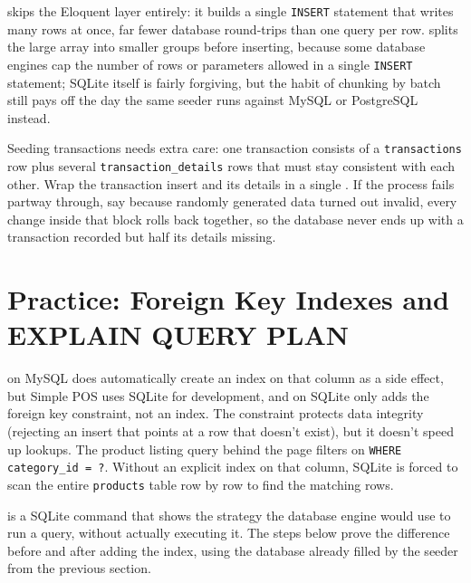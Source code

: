  skips the Eloquent layer entirely: it
builds a single \texttt{INSERT} statement that writes many rows at
once, far fewer database round-trips than one query per row.
 splits the large array into smaller groups before
inserting, because some database engines cap the number of rows or
parameters allowed in a single \texttt{INSERT} statement; SQLite itself
is fairly forgiving, but the habit of chunking by batch still pays off
the day the same seeder runs against MySQL or PostgreSQL instead.

\begin{warningbox}
Seeding transactions needs extra care: one transaction consists of a
\texttt{transactions} row plus several \texttt{transaction\_details}
rows that must stay consistent with each other. Wrap the transaction
insert and its details in a single
. If the process fails
partway through, say because randomly generated data turned out
invalid, every change inside that block rolls back together, so the
database never ends up with a transaction recorded but half its details
missing.
\end{warningbox}

\section{Practice: Foreign Key Indexes and EXPLAIN QUERY PLAN}
\label{sec:desain-basis-data-3}

 on MySQL does automatically create an
index on that column as a side effect, but Simple POS uses SQLite for
development, and on SQLite  only adds the foreign
key constraint, not an index. The constraint protects data integrity
(rejecting an insert that points at a row that doesn't exist), but it
doesn't speed up lookups. The product listing query behind the
 page filters on \texttt{WHERE category\_id = ?}.
Without an explicit index on that column, SQLite is forced to scan the
entire \texttt{products} table row by row to find the matching rows.

 is a SQLite command that shows the strategy
the database engine would use to run a query, without actually
executing it. The steps below prove the difference before and after
adding the index, using the database already filled by the seeder from
the previous section.


